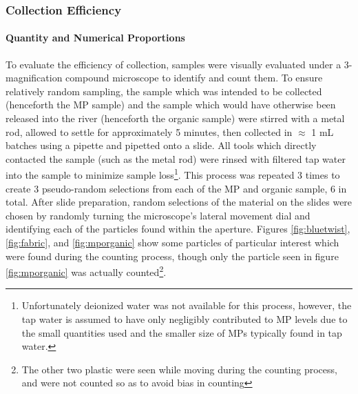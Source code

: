 \documentclass[fleqn,10pt]{SelfArx} %
\begin{document}
	\subsubsection{Collection Efficiency}
	\paragraph{Quantity and Numerical Proportions}
	To evaluate the efficiency of collection, samples were visually evaluated under a 3-magnification compound microscope to identify and count them. To ensure relatively random sampling, the sample which was intended to be collected (henceforth the MP sample) and the sample which would have otherwise been released into the river (henceforth the organic sample) were stirred with a metal rod, allowed to settle for approximately 5 minutes, then collected in $\approx$ 1 mL batches using a pipette and pipetted onto a slide. All tools which directly contacted the sample (such as the metal rod) were rinsed with filtered tap water into the sample to minimize sample loss\footnote{Unfortunately deionized water was not available for this process, however, the tap water is assumed to have only negligibly contributed to MP levels due to the small quantities used and the smaller size of MPs typically found in tap water.}. This process was repeated 3 times to create 3 pseudo-random selections from each of the MP and organic sample, 6 in total. After slide preparation, random selections of the material on the slides were chosen by randomly turning the microscope's lateral movement dial and identifying each of the particles found within the aperture. 
	Figures \ref{fig:bluetwist}, \ref{fig:fabric}, and \ref{fig:mporganic} show some particles of particular interest which were found during the counting process, though only the particle seen in figure \ref{fig:mporganic} was actually counted\footnote{The other two plastic were seen while moving during the counting process, and were not counted so as to avoid bias in counting}.
	
\end{document}
